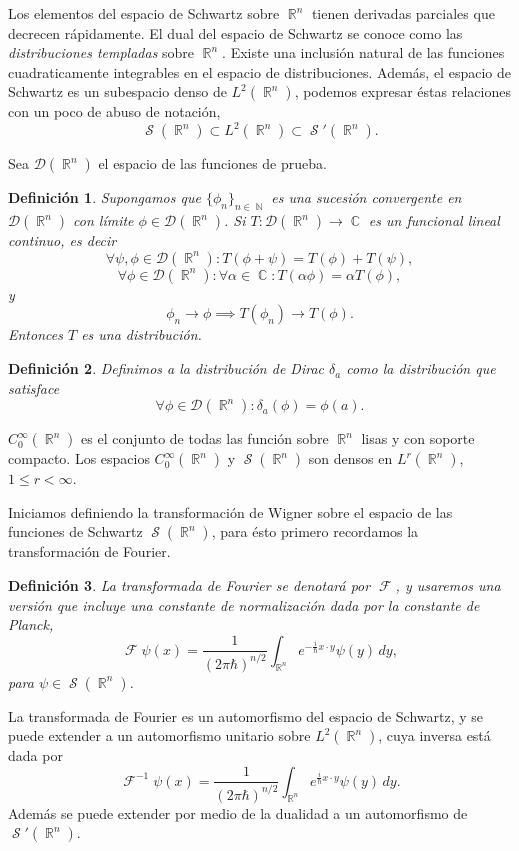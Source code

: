 \documentclass[a4paper]{report}
\DeclareMathOperator{\R}{\mathbb{R}}
\DeclareMathOperator{\C}{\mathbb{C}}
\DeclareMathOperator{\N}{\mathbb{N}}
\DeclareMathOperator{\Sz}{\mathcal S}
\DeclareMathOperator{\F}{\mathcal{F}}
\newtheorem{definition}{Definición}
\begin{document}
  Los elementos del espacio de Schwartz sobre $\R^{n}$
  tienen derivadas parciales que decrecen rápidamente. El
  dual del espacio de Schwartz se conoce como las
  \textit{distribuciones templadas} sobre $\R^{n}$. Existe
  una inclusión natural de las funciones cuadraticamente
  integrables en el espacio de distribuciones. Además, el
  espacio de Schwartz es un subespacio denso de
  $L^2(\R^{n})$, podemos expresar éstas relaciones con un
  poco de abuso de notación,
  \[
    \Sz(\R^{n})
    \subset L^2(\R^{n})
    \subset \Sz'(\R^{n}).
  \]


  Sea $\mathcal D(\R^{n})$ el espacio de las funciones de
  prueba.

  \begin{definition}
    Supongamos que $\{\phi_n\}_{n \in \N}$ es una sucesión
    convergente en $\mathcal D(\R^{n})$ con límite $\phi \in
    \mathcal D(\R^{n})$. Si $T : \mathcal D(\R^{n}) \to \C$
    es un funcional lineal continuo, es decir
    \[
      \forall \psi, \phi \in \mathcal D(\R^{n}) : T(\phi +
      \psi) = T(\phi) + T(\psi),
    \] 
    \[
      \forall \phi \in \mathcal D(\R^{n}) : \forall \alpha
      \in \C : T(\alpha \phi) = \alpha T(\phi),
    \] 
    y
    \[
      \phi_n \to \phi \implies T(\phi_n) \to T(\phi).
    \] 
    Entonces $T$ es una distribución.
  \end{definition}

  \begin{definition}
    Definimos a la distribución de Dirac $\delta_a$ como la
    distribución que satisface
    \[
      \forall \phi \in \mathcal D(\R^{n}) : \delta_a(\phi) =
      \phi(a).
    \] 
  \end{definition}

  $C^{\infty}_0(\R^{n})$ es el conjunto de todas las función
  sobre $\R^{n}$ lisas y con soporte compacto. Los espacios
  $C^{\infty}_0(\R^{n})$ y $\Sz(\R^{n})$ son densos en
  $L^{r}(\R^{n})$, $1 \leq r < \infty$.

  Iniciamos definiendo
  la transformación de Wigner sobre el espacio de las
  funciones de Schwartz $\Sz(\R^{n})$, para ésto primero
  recordamos la transformación de Fourier.

  \begin{definition}
    La transformada de Fourier se denotará por $\F$,
    y usaremos una versión que incluye una constante de
    normalización dada por la constante de Planck,
    \[
      \F\psi(x)
      = \frac{1}{(2\pi\hbar)^{n / 2}} \int_{\R^{n}}
      e^{-\frac{i}{\hbar} x \cdot y} \psi(y) \, dy,
    \] 
    para $\psi \in \Sz(\R^{n})$.
  \end{definition}
  La transformada de Fourier es un automorfismo del espacio
  de Schwartz, y se puede extender a un automorfismo
  unitario sobre $L^2(\R^{n})$, cuya inversa está dada por
  \[
    \F^{-1}\psi(x)
    = \frac{1}{(2\pi\hbar)^{n / 2}} \int_{\R^{n}}
    e^{\frac{i}{\hbar} x \cdot y} \psi(y) \, dy.
  \] 
  Además se puede extender por medio de la dualidad a un
  automorfismo de $\Sz'(\R^{n})$.
\end{document}
